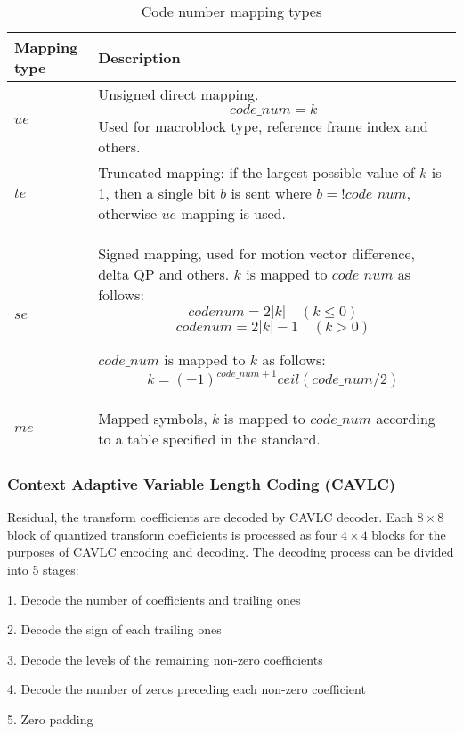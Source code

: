 \documentclass[../main.tex]{subfiles}
\begin{document}
\begin{table}[ht]
\begin{center}       
\begin{tabular}{|l|p{10cm}|} 
\hline
\rule[-1ex]{0pt}{3.5ex} Mapping type & Description \\  
\hline
\rule[-1ex]{0pt}{3.5ex} $ue$ & Unsigned direct mapping.
\[code\_num = k\]
Used for macroblock type, reference frame index and others. \\  
\hline
\rule[-1ex]{0pt}{3.5ex} $te$ & Truncated mapping: if the largest possible value of $k$ is 1, then a single bit $b$ is sent where $b = !code\_num$, otherwise $ue$ mapping is used. \\
\hline
\rule[-1ex]{0pt}{3.5ex} $se$ & Signed mapping, used for motion vector difference, delta QP and others. $k$ is mapped to $code\_num$ as follows: 
\[code num = 2|k| \quad (k \leq 0) \] 
\[code num = 2|k| - 1 \quad (k > 0) \] 

$code\_num$ is mapped to $k$ as follows:
\[k = (−1)^{code\_num + 1}ceil(code\_num / 2) \] \\
\hline
\rule[-1ex]{0pt}{3.5ex} $me$ & Mapped symbols, $k$ is mapped to $code\_num$ according to a table specified in the standard. \\
\hline
\end{tabular}
\end{center}
\caption[mapping]{\label{tab:mapping} Code number mapping types\cite{richardson2004h} } 
\end{table}

\subsubsection{ Context Adaptive Variable Length Coding (CAVLC) }
Residual, the transform coefficients are decoded by CAVLC decoder. Each $8 \times 8$ block of quantized transform coefficients is processed as four $4 \times 4$ blocks for the purposes of CAVLC encoding and decoding. The decoding process can be divided into 5 stages:

    1. Decode the number of coefficients and trailing ones
    
    2. Decode the sign of each trailing ones
    
    3. Decode the levels of the remaining non-zero coefficients
    
    4. Decode the number of zeros preceding each non-zero coefficient
    
    5. Zero padding 
\end{document}
